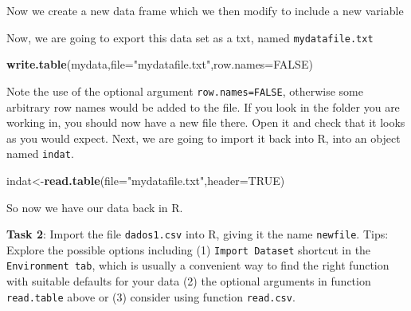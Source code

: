 \documentclass[
]{article}
\newenvironment{Shaded}{\begin{snugshade}}{\end{snugshade}}
\newcommand{\AttributeTok}[1]{\textcolor[rgb]{0.13,0.29,0.53}{#1}}
\newcommand{\ConstantTok}[1]{\textcolor[rgb]{0.56,0.35,0.01}{#1}}
\newcommand{\FunctionTok}[1]{\textcolor[rgb]{0.13,0.29,0.53}{\textbf{#1}}}
\newcommand{\NormalTok}[1]{#1}
\newcommand{\OtherTok}[1]{\textcolor[rgb]{0.56,0.35,0.01}{#1}}
\newcommand{\SpecialCharTok}[1]{\textcolor[rgb]{0.81,0.36,0.00}{\textbf{#1}}}
\newcommand{\StringTok}[1]{\textcolor[rgb]{0.31,0.60,0.02}{#1}}
\begin{document}
Now we create a new data frame which we then modify to include a new
variable

\begin{Shaded}
\end{Shaded}

Now, we are going to export this data set as a txt, named
\texttt{mydatafile.txt}

\begin{Shaded}
\begin{Highlighting}[]
\FunctionTok{write.table}\NormalTok{(mydata,}\AttributeTok{file=}\StringTok{"mydatafile.txt"}\NormalTok{,}\AttributeTok{row.names=}\ConstantTok{FALSE}\NormalTok{)}
\end{Highlighting}
\end{Shaded}

Note the use of the optional argument \texttt{row.names=FALSE},
otherwise some arbitrary row names would be added to the file. If you
look in the folder you are working in, you should now have a new file
there. Open it and check that it looks as you would expect. Next, we are
going to import it back into R, into an object named \texttt{indat}.

\begin{Shaded}
\begin{Highlighting}[]
\NormalTok{indat}\OtherTok{\textless{}{-}}\FunctionTok{read.table}\NormalTok{(}\AttributeTok{file=}\StringTok{"mydatafile.txt"}\NormalTok{,}\AttributeTok{header=}\ConstantTok{TRUE}\NormalTok{)}
\end{Highlighting}
\end{Shaded}

So now we have our data back in R.

\textbf{Task 2}: Import the file \texttt{dados1.csv} into R, giving it
the name \texttt{newfile}. Tips: Explore the possible options including
(1) \texttt{Import\ Dataset} shortcut in the \texttt{Environment\ tab},
which is usually a convenient way to find the right function with
suitable defaults for your data (2) the optional arguments in function
\texttt{read.table} above or (3) consider using function
\texttt{read.csv}.
\end{document}
